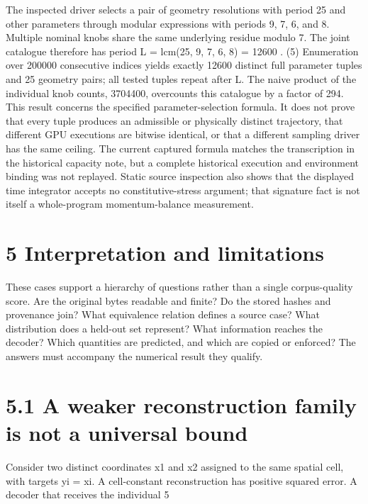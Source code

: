 \documentclass[11pt]{article}
\begin{document}
The inspected driver selects a pair of geometry resolutions with period 25 and other parameters
through modular expressions with periods 9, 7, 6, and 8. Multiple nominal knobs share the same
underlying residue modulo 7. The joint catalogue therefore has period
L = lcm(25, 9, 7, 6, 8) = 12600 . (5)
Enumeration over 200000 consecutive indices yields exactly 12600 distinct full parameter tuples
and 25 geometry pairs; all tested tuples repeat after L. The naive product of the individual knob
counts, 3704400, overcounts this catalogue by a factor of 294.
This result concerns the specified parameter-selection formula. It does not prove that every tuple
produces an admissible or physically distinct trajectory, that different GPU executions are bitwise
identical, or that a different sampling driver has the same ceiling. The current captured formula
matches the transcription in the historical capacity note, but a complete historical execution and
environment binding was not replayed. Static source inspection also shows that the displayed time
integrator accepts no constitutive-stress argument; that signature fact is not itself a whole-program
momentum-balance measurement.

\section*{5 Interpretation and limitations}

These cases support a hierarchy of questions rather than a single corpus-quality score. Are the
original bytes readable and finite? Do the stored hashes and provenance join? What equivalence
relation defines a source case? What distribution does a held-out set represent? What information
reaches the decoder? Which quantities are predicted, and which are copied or enforced? The
answers must accompany the numerical result they qualify.

\section*{5.1 A weaker reconstruction family is not a universal bound}

Consider two distinct coordinates x1 and x2 assigned to the same spatial cell, with targets yi = xi.
A cell-constant reconstruction has positive squared error. A decoder that receives the individual
5
\end{document}

